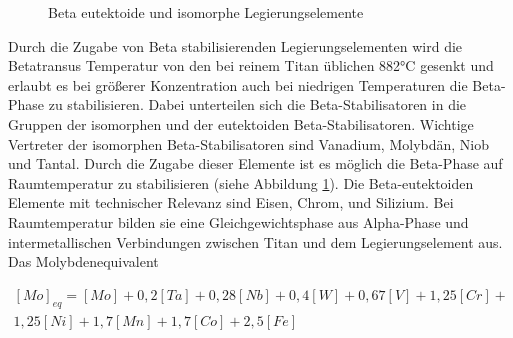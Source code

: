 \documentclass[a4paper, 11pt]{tubsreprt}
\begin{document}
\begin{figure}
\caption{Beta eutektoide und isomorphe Legierungselemente}
\label{Beta eutektisch isomorphe legierungselemente}
\end{figure}

Durch die Zugabe von Beta stabilisierenden Legierungselementen wird die Betatransus Temperatur von den bei reinem Titan üblichen 882°C gesenkt und erlaubt es bei größerer Konzentration auch bei niedrigen Temperaturen die Beta-Phase zu stabilisieren. Dabei unterteilen sich die Beta-Stabilisatoren in die Gruppen der isomorphen und der eutektoiden Beta-Stabilisatoren.
Wichtige Vertreter der isomorphen Beta-Stabilisatoren sind Vanadium, Molybdän, Niob und Tantal. Durch die Zugabe dieser Elemente ist es möglich die Beta-Phase auf Raumtemperatur zu stabilisieren (siehe Abbildung \ref{Beta eutektisch isomorphe legierungselemente}).
\newpage
Die Beta-eutektoiden Elemente mit technischer Relevanz sind Eisen, Chrom, und Silizium. Bei Raumtemperatur bilden sie eine Gleichgewichtsphase aus Alpha-Phase und intermetallischen Verbindungen zwischen Titan und dem Legierungselement aus. Das Molybdenequivalent

\begin{equation}
\begin{split}
[Mo]_{eq}=[Mo]+0,2[Ta]+0,28[Nb]+0,4[W]+0,67[V]+1,25[Cr]+ \\
1,25[Ni]+1,7[Mn]+1,7[Co]+2,5[Fe]
\end{split}
\label{Molybdenequivalent}
\end{equation}
\end{document}
